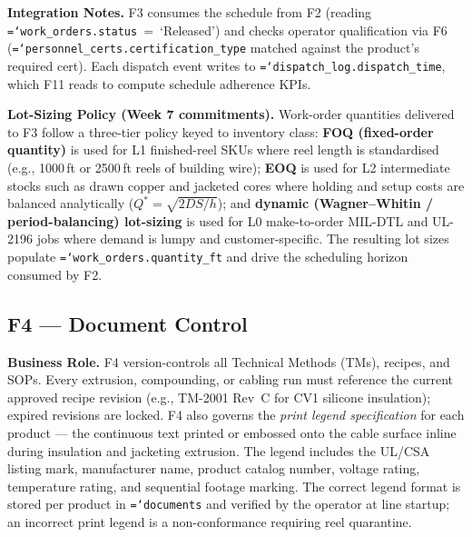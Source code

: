 \documentclass[11pt]{article}
\newcommand{\tfield}[1]{\texttt{\hyphenchar\font=`\-\relax #1}}
\begin{document}
\textbf{Integration Notes.}
F3 consumes the schedule from F2 (reading \tfield{work\_orders.status}~=~`Released') and checks operator qualification via F6 (\tfield{personnel\_certs.certification\_type} matched against the product's required cert).  Each dispatch event writes to \tfield{dispatch\_log.dispatch\_time}, which F11 reads to compute schedule adherence KPIs.

\textbf{Lot-Sizing Policy (Week 7 commitments).}  Work-order quantities delivered to F3 follow a three-tier policy keyed to inventory class: \textbf{FOQ (fixed-order quantity)} is used for L1 finished-reel SKUs where reel length is standardised (e.g., 1000\,ft or 2500\,ft reels of building wire); \textbf{EOQ} is used for L2 intermediate stocks such as drawn copper and jacketed cores where holding and setup costs are balanced analytically ($Q^* = \sqrt{2DS/h}$); and \textbf{dynamic (Wagner--Whitin / period-balancing) lot-sizing} is used for L0 make-to-order MIL-DTL and UL-2196 jobs where demand is lumpy and customer-specific.  The resulting lot sizes populate \tfield{work\_orders.quantity\_ft} and drive the scheduling horizon consumed by F2.

\subsection{F4 --- Document Control}

\textbf{Business Role.}
F4 version-controls all Technical Methods (TMs), recipes, and SOPs.  Every extrusion, compounding, or cabling run must reference the current approved recipe revision (e.g., TM-2001 Rev~C for CV1 silicone insulation); expired revisions are locked.  F4 also governs the \emph{print legend specification} for each product --- the continuous text printed or embossed onto the cable surface inline during insulation and jacketing extrusion.  The legend includes the UL/CSA listing mark, manufacturer name, product catalog number, voltage rating, temperature rating, and sequential footage marking.  The correct legend format is stored per product in \tfield{documents} and verified by the operator at line startup; an incorrect print legend is a non-conformance requiring reel quarantine.
\end{document}
